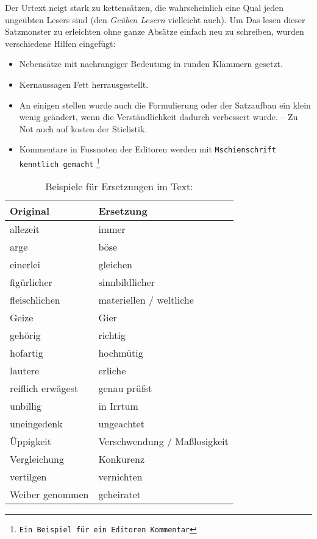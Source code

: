 \medskip

Der Urtext neigt stark zu kettensätzen, die wahrscheinlich eine Qual jeden
ungeübten Lesers sind (den \textit{Geüben Lesern} vielleicht auch). Um
Das lesen dieser Satzmonster zu erleichten ohne ganze Absätze einfach neu
zu schreiben, wurden verschiedene Hilfen eingefügt:

\begin{itemize}
 \item Nebensätze mit nachrangiger Bedeutung in runden Klammern gesetzt.
 \item Kernaussagen Fett herrausgestellt.
 \item An einigen stellen wurde auch die Formulierung oder der Satzaufbau
 ein klein wenig geändert, wenn die Verständlichkeit dadurch verbessert wurde.
 -- Zu Not auch auf kosten der Stielistik.
 \item Kommentare in Fussnoten der Editoren werden mit
 \texttt{Mschienschrift kenntlich gemacht}
 \footnote{\texttt{Ein Beispiel für ein Editoren
 Kommentar}}
\end{itemize}

\begin{table} \centering
\caption{Beispiele für Ersetzungen im Text:}
\label{ref:tab_wortersetzungen}
\begin{tabular}{|l|l|} \hline
\textbf{Original} 	& \textbf{Ersetzung} 		\\ \hline \hline
allezeit 		& immer  			\\ \hline
arge 			& böse  			\\ \hline
einerlei 		& gleichen 	 		\\ \hline
figürlicher 		& sinnbildlicher  		\\ \hline
fleischlichen  		& materiellen / weltliche  	\\ \hline
Geize			& Gier\\ \hline
gehörig 		& richtig			\\ \hline
hofartig 		& hochmütig			\\ \hline
lautere 		& erliche   			\\ \hline
reiflich erwägest 	& genau prüfst 			\\ \hline
unbillig       		& in Irrtum  			\\ \hline
uneingedenk 		& ungeachtet			\\ \hline
Üppigkeit 		& Verschwendung / Maßlosigkeit		\\ \hline
Vergleichung 		& Konkurenz  			\\ \hline
vertilgen 		& vernichten			\\ \hline
Weiber genommen 	& geheiratet  			\\ \hline
 
\end{tabular} 

\end{table}

